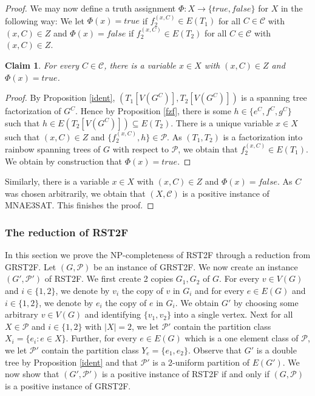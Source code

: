 \documentclass{article}
\newtheorem{Claim}[Statement]{Claim}
\begin{document}
\begin{proof}
We may now define a truth assignment $\Phi:X \rightarrow \{true,false\}$ for $X$ in the following way: We let $\Phi(x)=true$ if $f_2^{(x,C)}\in E(T_1)$ for all $C \in \mathcal{C}$ with $(x,C) \in Z$ and $\Phi(x)=false$ if $f_2^{(x,C)}\in E(T_2)$ for all $C \in \mathcal{C}$ with $(x,C) \in Z$. 

\begin{Claim}
For every $C \in \mathcal{C}$, there is a variable $x \in X$ with $(x,C) \in Z$ and $\Phi(x)=true$.
\end{Claim}
\begin{proof}
By Proposition \ref{ident}, $(T_1[V(G^C)],T_2[V(G^C)])$ is a spanning tree factorization of $G^C$. Hence by Proposition \ref{fzf}, there is some $h \in \{e^C,f^C,g^C\}$ such that $h \in E(T_2[V(G^C)])\subseteq E(T_2)$. There is a unique variable $x \in X$ such that $(x,C)\in Z$ and $\{f_2^{(x,C)},h\} \in \mathcal{P}$. As $(T_1,T_2)$ is a factorization into rainbow spanning trees of $G$ with respect to $\mathcal{P}$, we obtain that $f_2^{(x,C)} \in E(T_1)$. We obtain by construction that $\Phi(x)=true$. 
\end{proof}

Similarly, there is a variable $x \in X$ with $(x,C) \in Z$ and $\Phi(x)=false$. As $C$ was chosen arbitrarily, we obtain that $(X,\mathcal{C})$ is a positive instance of MNAE3SAT. This finishes the proof.
\end{proof}

\subsubsection{The reduction of RST2F}\label{concfac}

In this section we prove the NP-completeness of RST2F through a reduction from GRST2F. Let $(G,\mathcal{P})$ be an instance of GRST2F. We now create an instance $(G',\mathcal{P}')$ of RST2F. We first create 2 copies $G_1,G_2$ of $G$. For every $v \in V(G)$ and $i \in \{1,2\}$, we denote by $v_i$ the copy of $v$ in $G_i$ and for every $e \in E(G)$  and $i \in \{1,2\}$, we denote by $e_i$ the copy of $e$ in $G_i$. We obtain $G'$ by choosing some arbitrary $v \in V(G)$ and identifying $\{v_1,v_2\}$ into a single vertex. Next for all $X \in \mathcal{P}$ and $i \in\{1,2\}$ with $| X|=2$, we let $\mathcal{P}'$ contain the partition class $X_i=\{e_i:e \in X\}$. Further, for every $e \in E(G)$ which is a one element class of $\mathcal{P}$, we let $\mathcal{P}'$ contain the partition class $Y_e=\{e_1,e_2\}$. Observe that $G'$ is a double tree by Proposition \ref{ident} and that $\mathcal{P}'$ is a 2-uniform partition of $E(G')$. We now show that $(G',\mathcal{P}')$ is a positive instance of RST2F if and only if $(G,\mathcal{P})$ is a positive instance of GRST2F.
\end{document}
